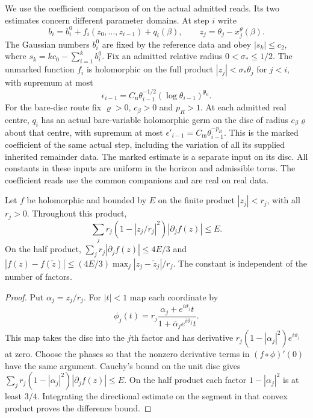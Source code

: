 \documentclass[11pt,letterpaper,reqno]{amsart}
\makeatletter
\numberwithin{equation}{section}
\theoremstyle{definition}
\newcommand{\ms@minorstart}{%
  \pushQED{\qed}\renewcommand{\qedsymbol}{$\blacksquare$}}
\newenvironment{lemma}[1][]{\ms@minorstart\ms@lemma[#1]}
  {\popQED\endms@lemma}
\theoremstyle{remark}
\makeatother
\begin{document}
We use the coefficient comparison of \cite[Theorem A and Corollary
6.4]{EM} on the actual admitted reads. Its two estimates concern
different parameter domains. At step $i$ write
\begin{equation}\label{rt:eq-frozen-increment}
  b_i=b_i^0+f_i(z_0,\ldots,z_{i-1})+q_i(\beta),
  \qquad z_j=\theta_j-x_j^\theta(\beta).
\end{equation}
The Gaussian numbers $b_i^0$ are fixed by the reference data and
obey $|s_k|\le c_2$, where $s_k=kc_0-\sum_{i=1}^k b_i^0$.
Fix an admitted relative radius $0<\sigma_*\le1/2$. The
unmarked function $f_i$ is holomorphic on the full product
$|z_j|<\sigma_*\theta_j$ for $j<i$, with supremum at most
\[
     \epsilon_{i-1}=C_{\mathrm u}\theta_{i-1}^{-1/2}
                                  (\log\theta_{i-1})^{\mathfrak p_0}.
\]
For the bare-disc route fix $\varrho>0$, $c_\beta>0$ and $p_R>1$.
At each admitted real
centre, $q_i$ has an actual bare-variable holomorphic germ on the
disc of radius $c_\beta\varrho$ about that centre, with supremum
at most $\epsilon'_{i-1}=C_{\mathrm m}\theta_{i-1}^{-p_R}$.
This is the marked coefficient of the same actual step, including
the variation of all its supplied inherited remainder data. The
marked estimate is a separate input on its disc. All constants in
these inputs are uniform in the horizon and admissible torus. The
coefficient reads use the common companions and are real on real
data.

\begin{lemma}[A product-disc derivative bound]\label{rt:lem-polydisc-slope}
Let $f$ be holomorphic and bounded by $E$ on the finite product
$|z_j|<r_j$, with all $r_j>0$. Throughout this product,
\begin{equation}\label{rt:eq-polydisc-weighted}
 \sum_j r_j(1-|z_j/r_j|^2)|\partial_j f(z)|\le E.
\end{equation}
On the half product, $\sum_jr_j|\partial_j f(z)|\le4E/3$ and
$|f(z)-f(\widetilde z)|\le(4E/3)\max_j|z_j-\widetilde z_j|/r_j$.
The constant is independent of the number of factors.
\end{lemma}
\begin{proof}
Put $\alpha_j=z_j/r_j$. For $|t|<1$ map each coordinate by
\[
  \phi_j(t)=r_j\frac{\alpha_j+e^{i\vartheta_j}t}
                         {1+\bar\alpha_j e^{i\vartheta_j}t}.
\]
This map takes the disc into the $j$th factor and has derivative
$r_j(1-|\alpha_j|^2)e^{i\vartheta_j}$ at zero. Choose the phases
so that the nonzero derivative terms in $(f\circ\phi)'(0)$ have
the same argument. Cauchy's bound on the unit disc gives
$\sum_j r_j(1-|\alpha_j|^2)|\partial_jf(z)|\le E$. On the half
product each factor $1-|\alpha_j|^2$ is at least $3/4$. Integrating
the directional estimate on the segment in that convex product
proves the difference bound.
\end{proof}
\end{document}
